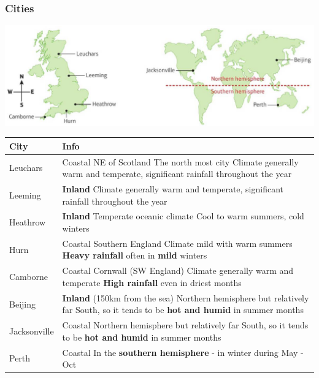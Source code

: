 \documentclass[A4paper, 11pt]{article}
\begin{document}
	\subsubsection{Cities}
	\includegraphics{LDSmap}\\
	\begin{tabular}{|p{2cm}|p{15cm}|}
		\hline
		\textbf{City} & \textbf{Info} \\
		\hline
		Leuchars & Coastal \newline NE of Scotland \newline The north most city \newline Climate generally warm and temperate, significant rainfall throughout the year\\
		\hline
		Leeming & \textbf{Inland} \newline Climate generally warm and temperate, significant rainfall throughout the year\\
		\hline
		Heathrow  & \textbf{Inland} \newline Temperate oceanic climate \newline Cool to warm summers, cold winters\\
		\hline
		Hurn  & Coastal \newline Southern England \newline Climate mild with warm summers \newline \textbf{Heavy rainfall} often in \textbf{mild} winters\\
		\hline
		Camborne & Coastal \newline Cornwall (SW England) \newline Climate generally warm and temperate \newline \textbf{High rainfall} even in driest months\\
		\hline
		Beijing  & \textbf{Inland} (150km from the sea) \newline Northern hemisphere but relatively far South, so it tends to be \textbf{hot and humid} in summer months\\
		\hline
		Jacksonville  & Coastal \newline Northern hemisphere but relatively far South, so it tends to be \textbf{hot and humid} in summer months \\
		\hline
		Perth & Coastal \newline In the \textbf{southern hemisphere} - in winter during May - Oct\\
		\hline
	\end{tabular}
	
\end{document}
